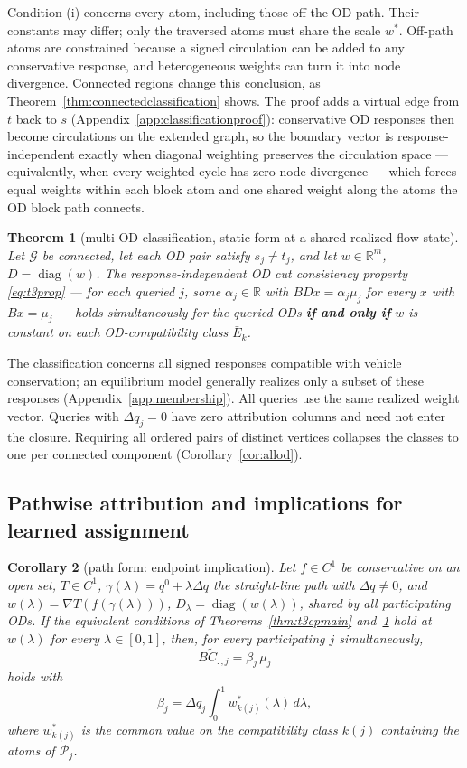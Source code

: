 \documentclass[a4paper,fleqn]{cas-sc}
\newtheorem{theorem}{Theorem}
\newtheorem{corollary}[theorem]{Corollary}
\newcommand{\R}{\mathbb{R}}
\begin{document}
Condition (i) concerns every atom, including those off the OD path. Their
constants may differ; only the traversed atoms must share the scale $w^*$.
Off-path atoms are constrained because a signed circulation can
be added to any conservative response, and heterogeneous weights can turn
it into node divergence. Connected regions change this conclusion, as
Theorem~\ref{thm:connectedclassification} shows. The proof adds a virtual
edge from $t$ back to $s$
(Appendix~\ref{app:classificationproof}): conservative OD responses then
become circulations on the extended graph, so the boundary vector is
response-independent exactly when diagonal weighting preserves the
circulation space --- equivalently, when every weighted cycle has zero
node divergence --- which forces equal weights within each block atom
and one shared weight along the atoms the OD block path connects.

\begin{theorem}[multi-OD classification, static form at a shared
realized flow state]\label{thm:t3cm}
Let $\mathcal{G}$ be connected, let each OD pair satisfy $s_j\ne t_j$,
and let $w\in\R^m$, $D=\operatorname{diag}(w)$. The
response-independent OD cut consistency property \eqref{eq:t3prop}
--- for each queried $j$, some $\alpha_j\in\R$ with
$BDx=\alpha_j\mu_j$ for every $x$ with $Bx=\mu_j$ --- holds
simultaneously for the queried ODs \textbf{if and only if} $w$ is
constant on each OD-compatibility class $\bar{E}_k$.
\end{theorem}

The classification concerns all signed responses compatible with vehicle
conservation; an equilibrium model generally realizes only a subset of
these responses (Appendix~\ref{app:membership}).
All queries use the same realized weight vector. Queries with $\Delta q_j=0$
have zero attribution columns and need not enter the closure. Requiring all
ordered pairs of distinct vertices collapses the classes to one per
connected component (Corollary~\ref{cor:allod}).

\subsection{Pathwise attribution and implications for learned assignment}\label{sec:pathwise}
\begin{corollary}[path form: endpoint implication]\label{cor:path}
Let $f\in C^1$ be conservative on an open set, $T\in C^1$,
$\gamma(\lambda)=q^0+\lambda\Delta q$ the straight-line path with $\Delta q\ne0$, and
$w(\lambda)=\nabla T(f(\gamma(\lambda)))$, $D_\lambda=\operatorname{diag}(w(\lambda))$, shared by
all participating ODs. If the equivalent conditions of
Theorems~\ref{thm:t3cpmain} and~\ref{thm:t3cm} hold at $w(\lambda)$ for
every $\lambda\in[0,1]$, then, for every participating $j$
simultaneously,
\[
B\widetilde{C}_{:,j}=\beta_j\,\mu_j
\]
holds with
\[
\beta_j=\Delta q_j\int_0^1 w^*_{k(j)}(\lambda)\,d\lambda,
\]
where $w^*_{k(j)}$
is the common value on the compatibility class $k(j)$ containing the
atoms of $\mathcal{P}_j$.
\end{corollary}
\end{document}
